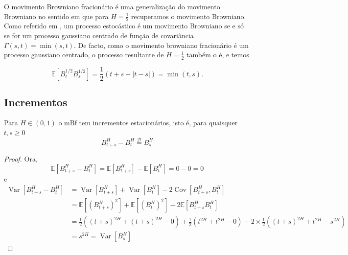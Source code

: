 \documentclass{article}
\begin{document}
\vspace{1cm}

O movimento Browniano fracionário é uma generalização do movimento Browniano no sentido em que para $H=\frac{1}{2}$ recuperamos o movimento Browniano. Como referido em \cite{Sznitman2013}, um processo estocástico é um movimento Browniano se e só se for um processo gaussiano centrado de função de covariância $\Gamma(s,t)=\min(s,t)$. De facto, como o movimento browniano fracionário é um processo gaussiano centrado, o processo resultante de $H=\frac{1}{2}$ também o é, e temos
 
$$\mathbb{E}[B_t^{1/2}B_s^{1/2}]=\frac{1}{2}(t+s-|t-s|)=\min(t,s).$$



\vspace{1cm}

\subsection{Incrementos}

\begin{thm}
Para $H \in (0,1)$  o mBf tem incrementos estacionários, isto é, para quaisquer $t,s\geq 0$
$$B^H_{t+s}-B^H_t \overset{\mathcal{D}}{=}B^H_s$$
\end{thm}
\begin{proof}
Ora, $$\mathbb{E}[B^H_{t+s}-B^H_t]=\mathbb{E}[B^H_{t+s}]-\mathbb{E}[B^H_t]=0-0=0$$
e
\begin{align*}
    \operatorname{Var}[B^H_{t+s}-B^H_t]&=\operatorname{Var}[B^H_{t+s}]+\operatorname{Var}[B^H_{t}]-2\operatorname{Cov}[B^H_{t+s},B^H_t]\\
    &=\mathbb{E}[(B^H_{t+s})^2]+\mathbb{E}[(B^H_t)^2]-2\mathbb{E}[B^H_{t+s}B^H_t]\\
    &=\frac{1}{2}((t+s)^{2H}+(t+s)^{2H}-0)+\frac{1}{2}(t^{2H}+t^{2H}-0)-2\times\frac{1}{2}((t+s)^{2H}+t^{2H}-s^{2H})\\
    &=s^{2H}=\operatorname{Var}[B_s^H]
\end{align*}
\end{proof}

\end{document}
